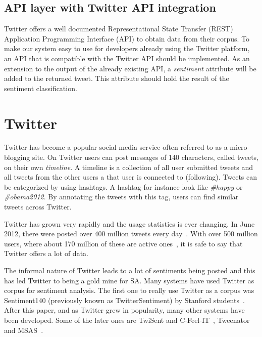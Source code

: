 	\subsection{API layer with Twitter API integration}
	Twitter offers a well documented Representational State Transfer (REST) Application Programming Interface (API) to obtain data from their corpus. To make our system easy to use for developers already using the Twitter platform, an API that is compatible with the Twitter API should be implemented. As an extension to the output of the already existing API, a \emph{sentiment} attribute will be added to the returned tweet. This attribute should hold the result of the sentiment classification.
	

\section{Twitter}

Twitter has become a popular social media service often referred to as a micro-blogging site. On Twitter users can post messages of 140 characters, called tweets, on their own \emph{timeline}. A timeline is a collection of all user submitted tweets and all tweets from the other users a that user is connected to (following). Tweets can be categorized by using hashtags. A hashtag for instance look like \emph{\#happy} or \emph{\#obama2012}. By annotating the tweets with this tag, users can find similar tweets across Twitter.

Twitter has grown very rapidly and the usage statistics is ever changing. In June 2012, there were posted over 400 million tweets every day~\citep{site:twitterusage}. With over 500 million users, where about 170 million of these are active ones~\citep{site:users}, it is safe to say that Twitter offers a lot of data.


The informal nature of Twitter leads to a lot of sentiments being posted and this has led Twitter to being a gold mine for SA. Many systems have used Twitter as corpus for sentiment analysis. The first one to really use Twitter as a corpus was Sentiment140 (previously known as TwitterSentiment) by Stanford students~\citep{article:go}. After this paper, and as Twitter grew in popularity, many other systems have been developed. Some of the later ones are TwiSent and C-Feel-IT~\citep{mukherjee2012twisent}, Tweenator~\citep{saif2012semantic} and MSAS~\citep{chamlertwat2012discovering}.
